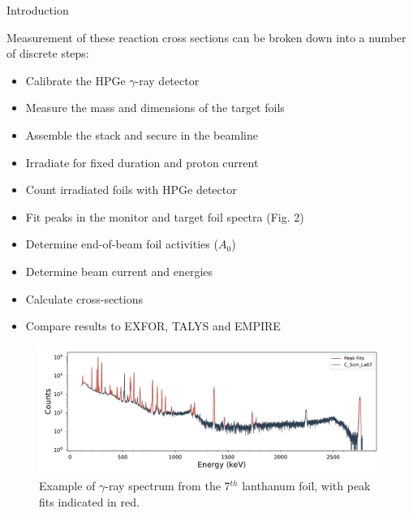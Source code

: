 \documentclass[final]{beamer}
\newlength{\onecolwid}
\begin{document}
\begin{frame}[t]
\begin{columns}[t]
\begin{column}{\onecolwid}
\begin{block}{Introduction}
{%
%

\hspace{50pt}Measurement of these reaction cross sections can be broken down into a number of discrete steps:

\begin{itemize}
\item Calibrate the HPGe $\gamma$-ray detector
\item Measure the mass and dimensions of the target foils
\item Assemble the stack and secure in the beamline
\item Irradiate for fixed duration and proton current
\item Count irradiated foils with HPGe detector
\item Fit peaks in the monitor and target foil spectra (Fig. 2)
\item Determine end-of-beam foil activities ($A_0$)
\item Determine beam current and energies
\item Calculate cross-sections
\item Compare results to EXFOR, TALYS and EMPIRE
\end{itemize}

}
\begin{figure}
\includegraphics[width=0.9\linewidth]{peak_fits/C_5cm_La07_fits.pdf}
\caption{Example of $\gamma$-ray spectrum from the 7$^{th}$ lanthanum foil, with peak fits indicated in red.}
\end{figure}


\end{block}
\end{column}
\end{columns}
\end{frame}
\end{document}

